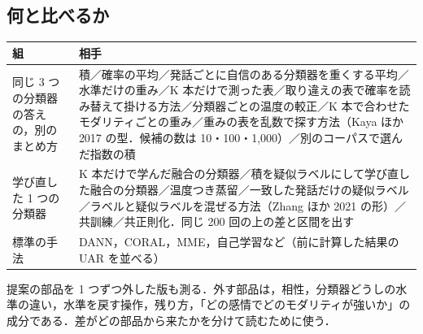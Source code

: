 \documentclass[a4paper,11pt]{ltjsarticle}
\begin{document}
\subsection*{何と比べるか}
\begin{center}
\small
\begin{tabular}{>{\raggedright}p{3.9cm}>{\raggedright\arraybackslash}p{11.2cm}}
\toprule
組 & 相手 \\
\midrule
同じ 3 つの分類器の答えの，別のまとめ方 & 積／確率の平均／発話ごとに自信のある分類器を重くする平均／水準だけの重み／K 本だけで測った表／取り違えの表で確率を読み替えて掛ける方法／分類器ごとの温度の較正／K 本で合わせたモダリティごとの重み／重みの表を乱数で探す方法（Kaya ほか 2017 の型．候補の数は 10・100・1,000）／別のコーパスで選んだ指数の積 \\
学び直した 1 つの分類器 & K 本だけで学んだ融合の分類器／積を疑似ラベルにして学び直した融合の分類器／温度つき蒸留／一致した発話だけの疑似ラベル／ラベルと疑似ラベルを混ぜる方法（Zhang ほか 2021 の形）／共訓練／共正則化．同じ 200 回の上の差と区間を出す \\
標準の手法 & DANN，CORAL，MME，自己学習など（前に計算した結果の UAR を並べる） \\
\bottomrule
\end{tabular}
\end{center}
提案の部品を 1 つずつ外した版も測る．外す部品は，相性，分類器どうしの水準の違い，水準を戻す操作，残り方，「どの感情でどのモダリティが強いか」の成分である．差がどの部品から来たかを分けて読むために使う．

\end{document}
